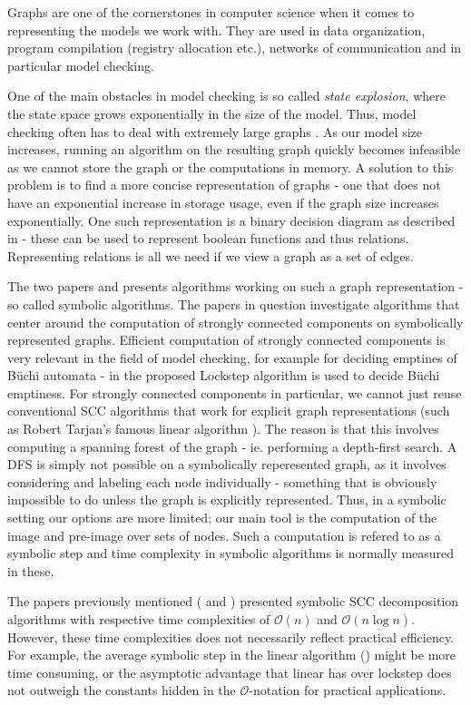 \documentclass[../master/master.tex]{subfiles}
\begin{document}
Graphs are one of the cornerstones in computer science when it comes to representing the models we work with. They are used in data organization,  program compilation (registry allocation etc.), networks of communication and in particular model checking.

One of the main obstacles in model checking is so called \textit{state explosion}, where the state space grows exponentially in the size of the model. Thus, model checking often has to deal with extremely large graphs \cite{pelanek_2004}. As our model size increases, running an algorithm on the resulting graph quickly becomes infeasible as we cannot store the graph or the computations in memory. A solution to this problem is to find a more concise representation of graphs - one that does not have an exponential increase in storage usage, even if the graph size increases exponentially. One such representation is a binary decision diagram as described in \cite{bryant_1992} - these can be used to represent boolean functions and thus relations. Representing relations is all we need if we view a graph as a set of edges.

The two papers \cite{linear} and \cite{lockstep} presents algorithms working on such a graph representation - so called symbolic algorithms. The papers in question investigate algorithms that center around the computation of strongly connected components on symbolically represented graphs. Efficient computation of strongly connected components is very relevant in the field of model checking, for example for deciding emptines of Büchi automata - in \cite{lockstep} the proposed Lockstep algorithm is used to decide Büchi emptiness.  For strongly connected components in particular, we cannot just reuse conventional SCC algorithms that work for explicit graph representations (such as Robert Tarjan's famous linear algorithm \cite{tarjan_1971}). The reason is that this involves computing a spanning forest of the graph - ie. performing a depth-first search. A DFS is simply not possible on a symbolically reperesented graph, as it involves considering and labeling each node individually - something that is obviously impossible to do unless the graph is explicitly represented. Thus, in a symbolic setting our options are more limited; our main tool is the computation of the image and pre-image over sets of nodes. Such a computation is refered to as a symbolic step and time complexity in symbolic algorithms is normally measured in these.

The papers previously mentioned (\cite{linear} and \cite{lockstep}) presented symbolic SCC decomposition algorithms with respective time complexities of $\mathcal{O}(n)$ and  $\mathcal{O}(n \log n)$. However, these time complexities does not necessarily reflect practical efficiency. For example, the average symbolic step in the linear algorithm (\cite{linear}) might be more time consuming, or the asymptotic advantage that linear has over lockstep does not outweigh the constants hidden in the $\mathcal{O} $-notation for practical applications. 
\end{document}
